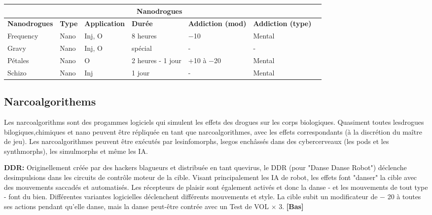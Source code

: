 \hspace{1cm} 

\begin{tabular}{|l|l|l|l|l|l|l|} \hline

\multicolumn{6}{|c|}{\textbf{Nanodrogues}}	\\ \hline

\textbf{Nanodrogues}	&\textbf{Type}	&\textbf{Application}	&\textbf{Durée}	&\textbf{Addiction (mod)}	&\textbf{Addiction (type)} \\ \hline

Frequency	&Nano	&Inj, O	&8 heures &$-$10	&Mental \\ \hline

Gravy	&Nano	&Inj, O	&spécial &- &- \\ \hline

Pétales	&Nano	&O	&2 heures - 1 jour	&+10 à $-$20	&Mental \\ \hline

Schizo	&Nano	&Inj	&1 jour	&- &Mental \\ \hline

\end{tabular} \label{tab:nanodrugs} 



\subsection{Narcoalgorithems} \label{sec:narcoalgorithms} 

Les narcoalgorithms sont des progammes logiciels qui simulent les effets des drogues sur les corps biologiques. Quasiment toutes lesdrogues bilogiques,chimiques et nano peuvent être répliquée en tant que narcoalgorithmes, avec les effets correspondants (à la discrétion du maître de jeu). Les narcoalgorithmes peuvent être exécutés par lesinfomorphs, lsegos enchâssés dans des cybercerveaux (les pods et les synthmorphs), les simulmorphs et même les IA. 

\textbf{DDR:} Originellement créée par des hackers blagueurs et distribuée en tant quevirus, le DDR (pour "Danse Danse Robot") déclenche desimpulsions dans les circuits de contrôle moteur de la cible. Visant principalement les IA de robot, les effets font "danser" la cible avec des mouvements saccadés et automatisés. Les récepteurs de plaisir sont également activés et donc la danse - et les mouvements de tout type - font du bien. Différentes variantes logicielles déclenchent différents mouvements et style. La cible subit un modificateur de $-$ 20 à toutes ses actions pendant qu'elle danse, mais la danse peut-être contrée avec un Test de VOL $\times$ 3. \textbf{[Bas]} 

